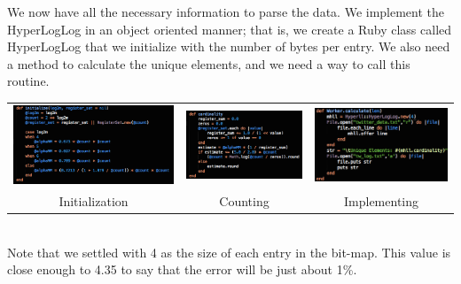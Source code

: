 \documentclass{article}
\begin{document}
\indent We now have all the necessary information to parse the data. We implement the HyperLogLog in an object oriented manner; that is, we create a Ruby class called HyperLogLog that we initialize with the number of bytes per entry.
We also need a method to calculate the unique elements, and we need a way to call this routine.
\begin{center}
\begin{tabular}{c c c}
\includegraphics[scale=0.3]{Twitter_problem/hll_init}
&
\includegraphics[scale=0.4]{Twitter_problem/hll_count}
&
\includegraphics[scale=0.4]{Twitter_problem/hll_imp}
\\
Initialization & Counting & Implementing
\end{tabular}
\end{center}
\noindent \\
Note that we settled with 4 as the size of each entry in the bit-map. This value is close enough to 4.35 to say that the error will be just about 1\%.
\end{document}
